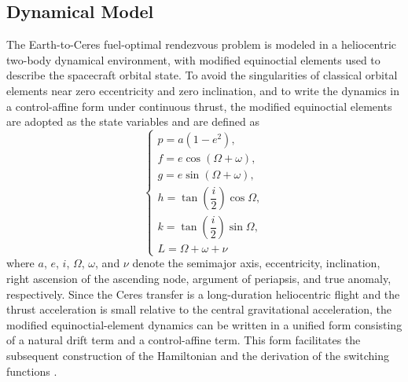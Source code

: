 ﻿\documentclass{IEEEtaes}
\begin{document}
\subsection{Dynamical Model}
The Earth-to-Ceres fuel-optimal rendezvous problem is modeled in a heliocentric two-body dynamical environment, with modified equinoctial elements used to describe the spacecraft orbital state. To avoid the singularities of classical orbital elements near zero eccentricity and zero inclination, and to write the dynamics in a control-affine form under continuous thrust, the modified equinoctial elements are adopted as the state variables and are defined as
\begin{equation}
\begin{cases}
p=a(1-e^2),\\
f=e\cos(\Omega+\omega),\\
g=e\sin(\Omega+\omega),\\
h=\tan\left(\dfrac{i}{2}\right)\cos\Omega,\\
k=\tan\left(\dfrac{i}{2}\right)\sin\Omega,\\
L=\Omega+\omega+\nu
\end{cases}
\end{equation}
where $a$, $e$, $i$, $\Omega$, $\omega$, and $\nu$ denote the semimajor axis, eccentricity, inclination, right ascension of the ascending node, argument of periapsis, and true anomaly, respectively. Since the Ceres transfer is a long-duration heliocentric flight and the thrust acceleration is small relative to the central gravitational acceleration, the modified equinoctial-element dynamics can be written in a unified form consisting of a natural drift term and a control-affine term. This form facilitates the subsequent construction of the Hamiltonian and the derivation of the switching functions \cite{jiang2012,chi2022}.
\end{document}
